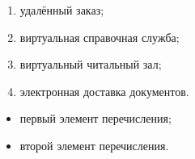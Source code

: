 \begin{enumerate}
  \item[а.] удалённый заказ; %
  \item[b)] виртуальная справочная служба; %
  \item[В)] виртуальный читальный зал; %
  \item[4.] электронная доставка документов. %
\end{enumerate}

\begin{itemize}
  \item[--] первый элемент перечисления; %
  \item[-] второй элемент перечисления. %
\end{itemize}

